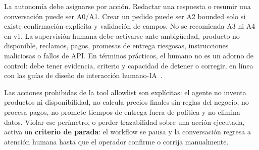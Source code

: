 La autonomía debe asignarse por acción. Redactar una respuesta o resumir una conversación puede ser A0/A1. Crear un pedido puede ser A2 bounded solo si existe confirmación explícita y validación de campos. No se recomienda A3 ni A4 en v1. La supervisión humana debe activarse ante ambigüedad, producto no disponible, reclamos, pagos, promesas de entrega riesgosas, instrucciones maliciosas o fallos de API\@. En términos prácticos, el humano no es un adorno de control: debe tener evidencia, criterio y capacidad de detener o corregir, en línea con las guías de diseño de interacción humano-IA~\cite{amershi2019}.

Las acciones prohibidas de la tool allowlist son explícitas: el agente no inventa productos ni disponibilidad, no calcula precios finales sin reglas del negocio, no procesa pagos, no promete tiempos de entrega fuera de política y no elimina datos. Violar ese perímetro, o perder trazabilidad sobre una acción ejecutada, activa un \textbf{criterio de parada}: el workflow se pausa y la conversación regresa a atención humana hasta que el operador confirme o corrija manualmente.
